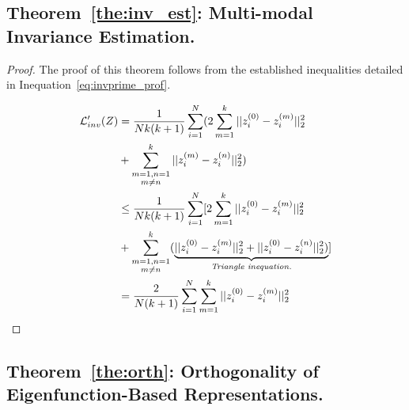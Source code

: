\subsection{\textbf{Theorem}~\ref{the:inv_est}: Multi-modal Invariance Estimation.}\label{proof:inv}

\begin{proof}
The proof of this theorem follows from the established inequalities detailed in Inequation~\ref{eq:invprime_prof}.

\begin{equation}
\begin{aligned}\label{eq:invprime_prof}
        \mathcal{L}_{inv}^\prime(Z) & = 
         \frac{1}{Nk(k + 1)}\sum_{i=1}^N(2\sum_{m=1}^k||z^{(0)}_i-z^{(m)}_i||^2_2 \\
        & + \sum_{\substack{m=1, n=1 \\ m \neq n}}^k||z^{(m)}_i - z^{(n)}_i||^2_2) \\
        & \leq \frac{1}{Nk(k + 1)}\sum_{i=1}^N[2\sum_{m=1}^k||z^{(0)}_i-z^{(m)}_i||^2_2 \\
        & + \sum_{\substack{m=1, n=1 \\ m \neq n}}^k(\underbrace{||z^{(0)}_i - z^{(m)}_i||^2_2+||z^{(0)}_i - z^{(n)}_i||^2_2)}_{\text{\textit{Triangle inequation.}}}] \\
        & = \frac{2}{N(k+1)} \sum_{i=1}^N\sum_{m=1}^k ||z^{(0)}_i - z^{(m)}_i||^2_2
\end{aligned}
\end{equation}
\end{proof}


\subsection{\textbf{Theorem}~\ref{the:orth}: Orthogonality of Eigenfunction-Based Representations.}

